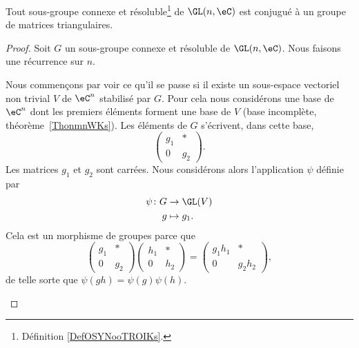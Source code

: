 \begin{theorem}  \label{ThoUWQBooCvutTO}
	Tout sous-groupe connexe et résoluble\footnote{Définition \ref{DefOSYNooTROIKs}.} de \( \GL(n,\eC)\) est conjugué à un groupe de matrices triangulaires.
\end{theorem}

\begin{proof}
	Soit \( G\) un sous-groupe connexe et résoluble de \( \GL(n,\eC)\). Nous faisons une récurrence sur \( n\).

	\begin{subproof}
		Nous commençons par voir ce qu'il se passe si il existe un sous-espace vectoriel non trivial \( V\) de \( \eC^n\) stabilisé par \( G\). Pour cela nous considérons une base de \( \eC^n\) dont les premiers éléments forment une base de \( V\) (base incomplète, théorème~\ref{ThonmnWKs}). Les éléments de \( G\) s'écrivent, dans cette base,
		\begin{equation}    \label{EqGOKTooEaGACG}
			\begin{pmatrix}
				g_1 & *   \\
				0   & g_2
			\end{pmatrix}.
		\end{equation}
		Les matrices \( g_1\) et \( g_2\) sont carrées. Nous considérons alors l'application \( \psi\) définie par
		\begin{equation}
			\begin{aligned}
				\psi\colon G & \to \GL(V)   \\
				g            & \mapsto g_1.
			\end{aligned}
		\end{equation}
		Cela est un morphisme de groupes parce que
		\begin{equation}
			\begin{pmatrix}
				g_1 & *   \\
				0   & g_2
			\end{pmatrix}\begin{pmatrix}
				h_1 & *   \\
				0   & h_2
			\end{pmatrix}=
			\begin{pmatrix}
				g_1h_1 & *      \\
				0      & g_2h_2
			\end{pmatrix},
		\end{equation}
		de telle sorte que \( \psi(gh)=\psi(g)\psi(h)\).


\end{subproof}
\end{proof}
